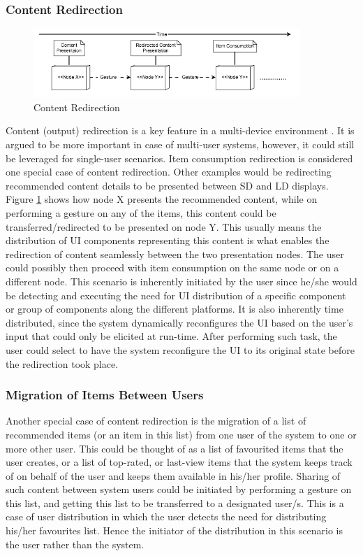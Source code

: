 \subsubsection{Content Redirection}
\begin{figure}[!htpb]
\includegraphics[width=0.9\textwidth, center, center]{figures/generic5}
\caption{Content Redirection}
\label{fig:figure35}
\end{figure}
Content (output) redirection is a key feature in a multi-device environment
\cite{elmqvist2011distributed}.
It is argued to be more important in case of multi-user systems, however, it could still be leveraged for single-user scenarios. Item consumption redirection is considered one special case of content redirection. Other examples would be redirecting recommended content details to be presented between SD and LD displays. Figure \ref{fig:figure35} shows how node X presents the recommended content, while on performing a gesture on any of the items, this content could be transferred/redirected to be presented on node Y. This usually means the distribution of UI components representing this content is what enables the redirection of content seamlessly between the two presentation nodes. The user could possibly then proceed with item consumption on the same node or on a different node.
This scenario is inherently initiated by the user since he/she would be detecting and executing the need for UI distribution of a specific component or group of components along the different platforms. It is also inherently time distributed, since the system dynamically reconfigures the UI based on the user's input that could only be elicited at run-time. After performing such task, the user could select to have the system reconfigure the UI to its original state before the redirection took place.

\subsubsection{Migration of Items Between Users}
Another special case of content redirection is the migration of a list of recommended items (or an item in this list) from one user of the system to one or more other user. This could be thought of as a list of favourited items that the user creates, or a list of top-rated, or last-view items that the system keeps track of on behalf of the user and keeps them available in his/her profile. Sharing of such content between system users could be initiated by performing a gesture on this list, and getting this list to be transferred to a designated user/s. This is a case of user distribution in which the user detects the need for distributing his/her favourites list. Hence the initiator of the distribution in this scenario is the user rather than the system.  
 
